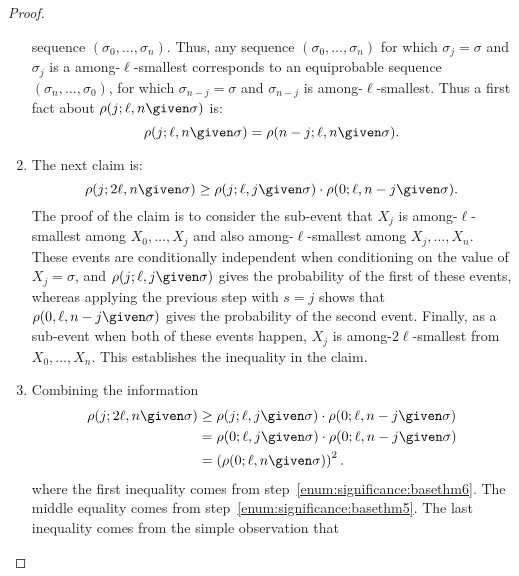 \documentclass[12pt]{article}
\begin{document}
\begin{proof}
\begin{enumerate}
            sequence \( (\sigma_0, \dots, \sigma_n ) \).  Thus, any
            sequence \( (\sigma_0,\dots, \sigma_n ) \) for which \(
            \sigma_j = \sigma \) and \( \sigma_j \) is a among-\( \ell \)-smallest
            corresponds to an equiprobable sequence \( (\sigma_n,\dots,
            \sigma_0 ) \), for which \( \sigma_{n-j} = \sigma \) and \(
            \sigma_{n-j} \) is among-\( \ell \)-smallest.  Thus a first
            fact about \( \rho(j; \ell, n \given \sigma) \) is:
            \[
                \rho(j; \ell, n \given \sigma) = \rho(n-j; \ell, n
                \given \sigma).
            \]
        \item \label{enum:significance:basethm6}
            The next claim is:
            \[
                \rho(j; 2\ell, n \given \sigma) \ge \rho(j; \ell, j \given
                \sigma) \cdot \rho(0; \ell, n-j \given \sigma).
            \] The proof of the claim is to consider the sub-event that \(
            X_j \) is among-\( \ell \)-smallest among \( X_0, \dots,
            X_j \) and also among-\( \ell \)-smallest among \( X_j, \dots, X_n \).  These events are
            conditionally independent when conditioning on the value of \(
            X_j = \sigma \), and \( \rho(j; \ell, j \given \sigma) \)
            gives the probability of the first of these events, whereas
            applying the previous step with \( s = j \) shows that \(
            \rho(0, \ell, n-j \given \sigma) \) gives the probability of
            the second event.  Finally, as a sub-event when both of these events
            happen, \( X_j \) is among-\( 2\ell \)-smallest from \( X_0,
            \dots, X_n \).  This establishes the inequality in the claim.
          \item \label{enum:significance:basethm7}
            Combining the information
            \begin{align*}
                \rho(j; 2\ell, n \given \sigma) &\ge \rho(j; \ell, j
                \given \sigma) \cdot \rho(0; \ell, n-j \given \sigma) \\
                &= \rho(0; \ell, j \given \sigma) \cdot \rho(0; \ell,
                n-j \given \sigma) \\
                &= \left( \rho(0; \ell, n \given \sigma) \right)^2.
            \end{align*}
            where the first inequality comes from
            step~\ref{enum:significance:basethm6}. The middle
            equality comes from 
            step~\ref{enum:significance:basethm5}.
            The last inequality comes from the simple observation that

\end{enumerate}
\end{proof}
\end{document}
